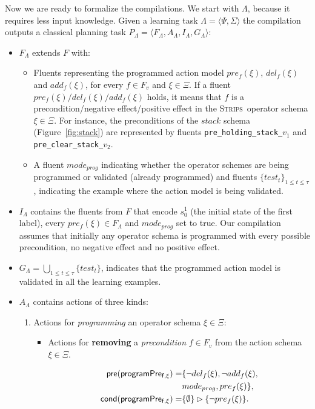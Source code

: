 \documentclass[letterpaper]{article} %
\newcommand{\tup}[1]{{\langle #1 \rangle}}
\newcommand{\pre}{\mathsf{pre}}     %
\newcommand{\cond}{\mathsf{cond}}   %
\newcommand{\strips}{\textsc{Strips}}     %
\begin{document}
Now we are ready to formalize the compilations. We start with $\Lambda$, because it requires less input knowledge. Given a learning task $\Lambda=\tup{\Psi,\Sigma}$ the compilation outputs a classical planning task $P_{\Lambda}=\tup{F_{\Lambda},A_{\Lambda},I_{\Lambda},G_{\Lambda}}$:
\begin{itemize}
\item $F_{\Lambda}$ extends $F$ with:
\begin{itemize}
\item Fluents representing the programmed action model $pre_f(\xi)$, $del_f(\xi)$ and $add_f(\xi)$, for every $f\in F_v$ and $\xi \in \Xi$. If a fluent $pre_f(\xi)/del_f(\xi)/add_f(\xi)$ holds, it means that $f$ is a precondition/negative effect/positive effect in the \strips\ operator schema $\xi\in \Xi$. For instance, the preconditions of the $stack$ schema (Figure~\ref{fig:stack}) are represented by fluents {\small\tt pre\_holding\_stack\_$v_1$} and {\small\tt pre\_clear\_stack\_$v_2$}.
\item A fluent $mode_{prog}$ indicating whether the operator schemes are being programmed or validated (already programmed) and fluents $\{test_t\}_{1\leq t\leq \tau}$, indicating the example where the action model is being validated. 
\end{itemize}
\item $I_{\Lambda}$ contains the fluents from $F$ that encode $s_0^1$ (the initial state of the first label), every $pre_f(\xi)\in F_{\Lambda}$ and $mode_{prog}$ set to true. Our compilation assumes that initially any operator schema is programmed with every possible precondition, no negative effect and no positive effect.
\item $G_{\Lambda}=\bigcup_{1\leq t\leq \tau}\{test_t\}$, indicates that the programmed action model is validated in all the learning examples.
\item $A_{\Lambda}$ contains actions of three kinds:
\begin{enumerate}
\item Actions for {\em programming} an operator schema $\xi\in\Xi$:
\begin{itemize}
\item Actions for {\bf removing} a {\em precondition} $f\in F_v$ from the action schema $\xi\in\Xi$.

\begin{small}
\begin{align*}
\hspace*{7pt}\pre(\mathsf{programPre_{f,\xi}})=&\{\neg del_{f}(\xi),\neg add_{f}(\xi),\\
& mode_{prog}, pre_{f}(\xi)\},\\
\cond(\mathsf{programPre_{f,\xi}})=&\{\emptyset\}\rhd\{\neg pre_{f}(\xi)\}.
\end{align*}
\end{small}


\end{itemize}
\end{enumerate}
\end{itemize}
\end{document}
